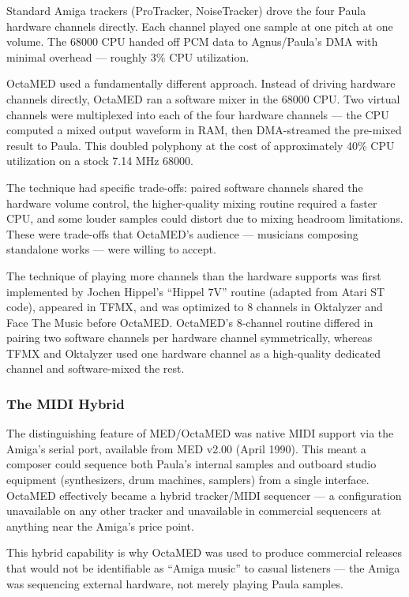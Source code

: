 \documentclass[11pt,letterpaper]{article}
\begin{document}
Standard Amiga trackers (ProTracker, NoiseTracker) drove the four Paula hardware channels directly. Each channel played one sample at one pitch at one volume. The 68000 CPU handed off PCM data to Agnus/Paula's DMA with minimal overhead --- roughly 3\% CPU utilization.

OctaMED used a fundamentally different approach. Instead of driving hardware channels directly, OctaMED ran a software mixer in the 68000 CPU. Two virtual channels were multiplexed into each of the four hardware channels --- the CPU computed a mixed output waveform in RAM, then DMA-streamed the pre-mixed result to Paula. This doubled polyphony at the cost of approximately 40\% CPU utilization on a stock 7.14 MHz 68000.

The technique had specific trade-offs: paired software channels shared the hardware volume control, the higher-quality mixing routine required a faster CPU, and some louder samples could distort due to mixing headroom limitations. These were trade-offs that OctaMED's audience --- musicians composing standalone works --- were willing to accept.

The technique of playing more channels than the hardware supports was first implemented by Jochen Hippel's ``Hippel 7V'' routine (adapted from Atari ST code), appeared in TFMX, and was optimized to 8 channels in Oktalyzer and Face The Music before OctaMED. OctaMED's 8-channel routine differed in pairing two software channels per hardware channel symmetrically, whereas TFMX and Oktalyzer used one hardware channel as a high-quality dedicated channel and software-mixed the rest.

\subsubsection{The MIDI Hybrid}

The distinguishing feature of MED/OctaMED was native MIDI support via the Amiga's serial port, available from MED v2.00 (April 1990). This meant a composer could sequence both Paula's internal samples and outboard studio equipment (synthesizers, drum machines, samplers) from a single interface. OctaMED effectively became a hybrid tracker/MIDI sequencer --- a configuration unavailable on any other tracker and unavailable in commercial sequencers at anything near the Amiga's price point.

This hybrid capability is why OctaMED was used to produce commercial releases that would not be identifiable as ``Amiga music'' to casual listeners --- the Amiga was sequencing external hardware, not merely playing Paula samples.
\end{document}
